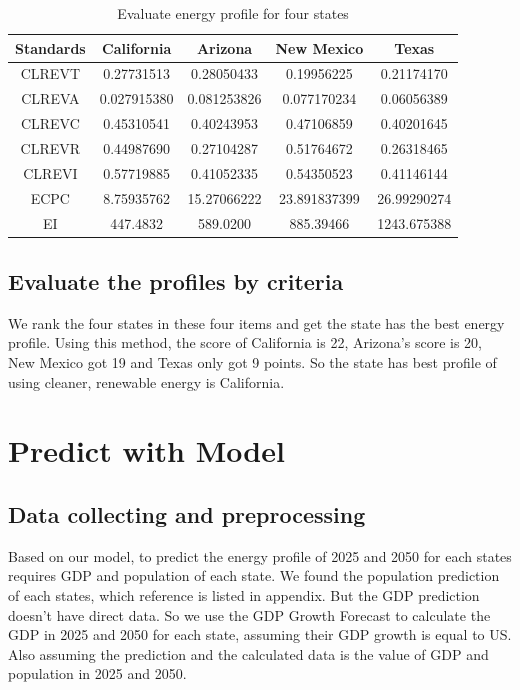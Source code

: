\documentclass{mcmthesis}
\begin{document}
\begin{table}[!htbp]
\centering
\caption{Evaluate energy profile for four states}\label{tab:aStrangeTable}
\begin{tabular}{ccccc}
\toprule
Standards& California& Arizona& New Mexico& Texas\\
\midrule
CLREVT& 0.27731513& 0.28050433& 0.19956225& 0.21174170 \\
CLREVA& 0.027915380& 0.081253826& 0.077170234& 0.06056389 \\
CLREVC& 0.45310541& 0.40243953& 0.47106859& 0.40201645 \\
CLREVR& 0.44987690& 0.27104287& 0.51764672& 0.26318465 \\
CLREVI& 0.57719885& 0.41052335& 0.54350523& 0.41146144 \\
ECPC& 8.75935762& 15.27066222& 23.891837399& 26.99290274 \\
EI& 447.4832& 589.0200& 885.39466& 1243.675388 \\
\bottomrule
\end{tabular}
\end{table}


\subsection{Evaluate the profiles by criteria }
We rank the four states in these four items and get the state has the best energy profile.
Using this method, the score of California is 22, Arizona's score is 20, New Mexico got 19 and Texas only got 9 points. So the state has best profile of using cleaner, renewable energy is
California.

\section{Predict with Model}
\subsection{Data collecting and preprocessing}
Based on our model, to predict the energy profile of 2025 and 2050 for each states requires GDP and population of each state.
We found the population prediction of each states, which reference is listed in appendix.
But the GDP prediction doesn't have direct data. So we use the GDP Growth Forecast to calculate the GDP in 2025 and 2050 for each state, assuming their GDP growth is equal to US.
Also assuming the prediction and the calculated data is the value of GDP and population in 2025 and 2050.
\end{document}
